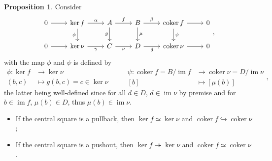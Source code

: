 \documentclass[10pt]{report}
\theoremstyle{definition}
\newtheorem{proposition}{Proposition}
\begin{document}
\begin{proposition}
Consider
$$
\begin{tikzcd}
0 \arrow[r] & \operatorname{ker}f \arrow[r, "\alpha"] \arrow[d, "\phi"'] & A \arrow[r, "f"] \arrow[d, "g"'] & B \arrow[r, "\beta"] \arrow[d, "\mu"] & \operatorname{coker}f \arrow[r] \arrow[d, "\psi"] & 0 \\
0 \arrow[r] & \operatorname{ker}\nu \arrow[r, "\gamma"']                 & C \arrow[r, "\nu"']              & D \arrow[r, "\delta"']                & \operatorname{coker}\nu \arrow[r]                 & 0
\end{tikzcd},
$$
with the map $\phi$ and $\psi$ is defined by
$$\begin{aligned}
\phi:\ker f&\to\ker\nu\\
(b,c)&\mapsto g(b,c)=c\in\ker\nu
\end{aligned}\quad\quad\begin{aligned}
\psi:\operatorname{coker}f=B/\operatorname{im}f&\to\operatorname{coker}\nu=D/\operatorname{im}\nu\\
[b]&\mapsto[\mu(b)]
\end{aligned},$$
the latter being well-defined since for all $d\in D$, $d\in\operatorname{im}\nu$ by premise and for $b\in\operatorname{im}f$, $\mu(b)\in D$, thus $\mu(b)\in\operatorname{im}\nu$.
\begin{itemize}
\item If the central square is a pullback, then $\ker f\simeq\ker\nu$ and $\operatorname{coker}f\hookrightarrow\operatorname{coker}\nu$;
\item If the central square is a pushout, then $\ker f\twoheadrightarrow\ker\nu$ and $\operatorname{coker}f\simeq\operatorname{coker}\nu$.
\end{itemize}
\end{proposition}
\end{document}

